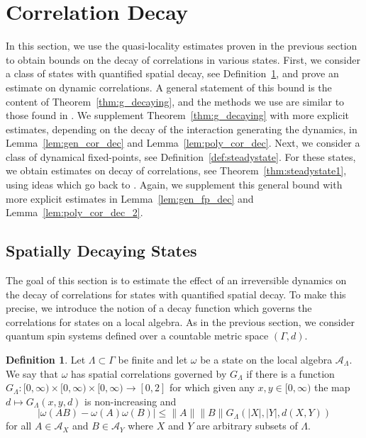 \documentclass{article}
\newcommand{\A}{\mathcal{A}}
\newcommand{\<}{\langle}
\renewcommand{\>}{\rangle}
\numberwithin{equation}{section}
\theoremstyle{definition}
\newtheorem{define}[thm]{Definition}
\begin{document}
\section{Correlation Decay}\label{sec:prop_of_corr}
In this section, we use the quasi-locality estimates proven in the previous section to obtain 
bounds on the decay of correlations in various states. First, we consider a class of states with 
quantified spatial decay, see Definition~\ref{def:spatiallydecayingstate}, and prove an estimate on dynamic correlations. A general statement of this
bound is the content of Theorem~\ref{thm:g_decaying}, and the methods we use are similar to those found in \cite{NachtergaeleOgataSims}. 
We supplement Theorem~\ref{thm:g_decaying} with more explicit estimates, depending on the decay of the
interaction generating the dynamics, in Lemma~\ref{lem:gen_cor_dec} and Lemma~\ref{lem:poly_cor_dec}. Next, we consider a class of dynamical fixed-points, see Definition~\ref{def:steadystate}. 
For these states, we obtain estimates on decay of correlations, see Theorem~\ref{thm:steadystate1}, using ideas which go back to \cite{Poulin}.    
Again, we supplement this general bound with more explicit estimates in Lemma~\ref{lem:gen_fp_dec} and Lemma~\ref{lem:poly_cor_dec_2}.

\subsection{Spatially Decaying States}\label{sec:spatiallydecaying}
The goal of this section is to estimate the effect of an irreversible dynamics 
on the decay of correlations for states with quantified spatial decay. 
To make this precise, we introduce the notion of a decay function which governs
the correlations for states on a local algebra. As in the previous section,
we consider quantum spin systems defined over a countable metric space $(\Gamma, d)$. 

\begin{define}\label{def:spatiallydecayingstate}
Let $\Lambda \subset \Gamma$ be finite and let $\omega$ be a state on the local algebra $\A_{\Lambda}$.
We say that $\omega$ has spatial correlations governed by $G_{\Lambda}$ if there is a function 
$G_{\Lambda}:[0, \infty) \times [0, \infty) \times [0, \infty) \to [0,2]$ for which given any $x,y \in [0, \infty)$ the map $d \mapsto G_{\Lambda}(x,y,d)$ is 
non-increasing and 
 \begin{equation}
            |\omega(AB) - \omega(A)\omega(B)| \le \| A \| \| B \| G_{\Lambda}(|X|,|Y|,d(X,Y))
\end{equation} 
for all $A \in \A_X$ and $B \in \A_Y$ where $X$ and $Y$ are arbitrary subsets of $\Lambda$.
\end{define}
\end{document}
